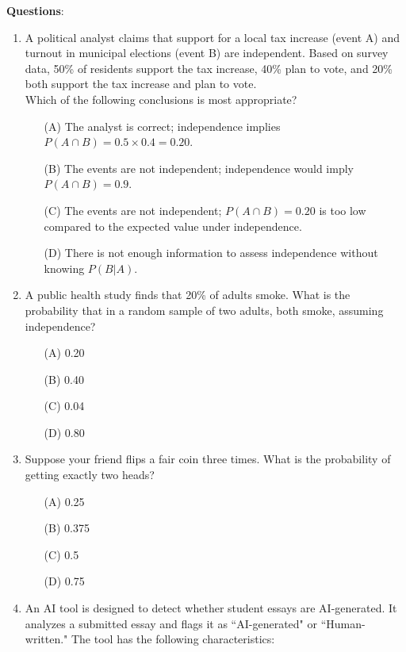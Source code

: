 \documentclass{article}
\begin{document}
\textbf{Questions}:
\begin{enumerate}
   \item A political analyst claims that support for a local tax increase (event A) and turnout in municipal elections (event B) are independent. Based on survey data, 50\% of residents support the tax increase, 40\% plan to vote, and 20\% both support the tax increase and plan to vote.  \\
    Which of the following conclusions is most appropriate?
    \begin{enumerate}
        \item[(A)] The analyst is correct; independence implies \( P(A \cap B) = 0.5 \times 0.4 = 0.20 \).
        \item[(B)] The events are not independent; independence would imply \( P(A \cap B) = 0.9 \).
        \item[(C)] The events are not independent; \( P(A \cap B) = 0.20 \) is too low compared to the expected value under independence.
        \item[(D)] There is not enough information to assess independence without knowing \( P(B|A) \).
    \end{enumerate}
    \item A public health study finds that 20\% of adults smoke. What is the probability that in a random sample of two adults, both smoke, assuming independence?
    \begin{enumerate}
        \item[(A)] 0.20
        \item[(B)] 0.40
        \item[(C)] 0.04
        \item[(D)] 0.80
    \end{enumerate}
    \item Suppose your friend flips a fair coin three times. What is the probability of getting exactly two heads?
    \begin{enumerate}
        \item[(A)] 0.25
        \item[(B)] 0.375
        \item[(C)] 0.5
        \item[(D)] 0.75
    \end{enumerate}
\item An AI tool is designed to detect whether student essays are AI-generated. It analyzes a submitted essay and flags it as ``AI-generated" or ``Human-written." The tool has the following characteristics:

\end{enumerate}
\end{document}
